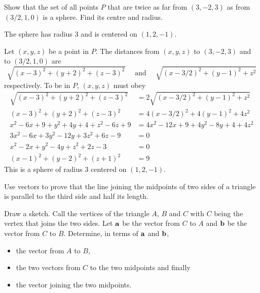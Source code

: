 \begin{question}
Show that the set of all points $P$ that are twice as far from
$(3,-2,3)$ as from $(3/2,1,0)$ is a sphere. Find its centre and radius.
\end{question}


\begin{answer}
The sphere has radius 3 and is centered on $(1,2,-1)$.
\end{answer}

\begin{solution}
Let $(x,y,z)$ be a point in $P$. The distances from
$(x,y,z)$ to $(3,-2,3)$ and to $(3/2,1,0)$ are 
\begin{equation*}
\sqrt{(x-3)^2+(y+2)^2+(z-3)^2}\quad\text{ and }\quad
\sqrt{(x-3/2)^2+(y-1)^2+z^2}
\end{equation*}
respectively. To be in $P$, $(x,y,z)$ must obey
\begin{align*}
\sqrt{(x-3)^2+(y+2)^2+(z-3)^2}&=2\sqrt{(x-3/2)^2+(y-1)^2+z^2} \\
(x-3)^2+(y+2)^2+(z-3)^2&=4(x-3/2)^2+4(y-1)^2+4z^2 \\
x^2-6x+9+y^2+4y+4+z^2-6z+9&=4x^2-12x+9+4y^2-8y+4+4z^2 \\
3x^2-6 x+3y^2-12y+3z^2+6z-9&=0 \\
x^2-2 x+y^2-4y+z^2+2z-3&=0 \\
(x-1)^2+(y-2)^2+(z+1)^2&=9
\end{align*}
This is a sphere of radius 3 centered on $(1,2,-1)$.
\end{solution}

\begin{question}
Use vectors to prove that the line joining the midpoints of two sides
of a triangle is parallel to the third side  and half its length.
\end{question}

\begin{hint}
Draw a sketch.
Call the vertices of the triangle $A$, $B$ and $C$ with $C$ being the
vertex that joins the two sides. Let $\mathbf{a}$ be the vector from $C$ to $A$ 
and $\mathbf{b}$ be the vector from $C$ to $B$. Determine, in terms of $\mathbf{a}$ and 
$\mathbf{b}$, 
\begin{itemize}\itemsep0pt \parskip0pt  %

\item 
the vector from $A$ to $B$, 
\item
the two vectors from $C$ to the two midpoints and finally 
\item
the vector joining the two midpoints. 
\end{itemize}
\end{hint}

